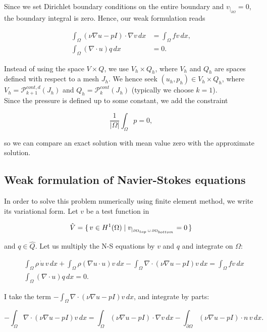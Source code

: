 \documentclass[11pt,a4paper,titlepage]{report}
\begin{document}
Since we set Dirichlet boundary conditions on the entire boundary and $v_{|_{\partial \Omega}} = 0$, the boundary integral is zero. Hence, our weak formulation reads

\begin{align}
\int_\Omega (\nu \nabla u - pI) \cdot \nabla v \,dx &= \int_\Omega fv \,dx, \\
\int_\Omega (\nabla \cdot u) q \,dx &= 0.
\end{align}

Instead of using the space $V \times Q$, we use $V_h \times Q_h$, where $V_h$ and $Q_h$ are spaces defined with respect to a mesh $J_h$. We hence seek $(u_h, p_h) \in V_h \times Q_h$, where $V_h = \mathcal{P}^{cont,d}_{k+1} (J_h)$ and $Q_h = \mathcal{P}^{cont}_{k} (J_h)$ (typically we choose $k=1$). \\


Since the pressure is defined up to some constant, we add the constraint 

\[
\frac{1}{|\Omega |} \int_{\Omega} p = 0,
\]

so we can compare an exact solution with mean value zero with the approximate solution. 

\subsection{Weak formulation of Navier-Stokes equations}


In order to solve this problem numerically using finite element method, we write its variational form. Let $v$ be a test function in

\[
\hat{V} = \set{v \in H^1(\Omega) | v_{|_{\partial \Omega_{top} \, \cup \, \partial \Omega_{bottom}}} = 0}
\]

and $q \in \hat{Q}$. Let us multiply the N-S equations by $v$ and $q$ and integrate on $\Omega$:

\begin{align}
&\int_{\Omega} \rho \, \dot{u} \, v \, dx + \int_{\Omega} \rho (\nabla u \cdot u)v \, dx - \int_{\Omega} \nabla \cdot (\nu \nabla u - pI)v \, dx = \int_{\Omega} fv \, dx \\
&\int_{\Omega} (\nabla \cdot u) q \, dx = 0.
\end{align}

I take the term $- \int_{\Omega} \nabla \cdot (\nu \nabla u - pI)v \, dx$, and integrate by parts:

\[
- \int_{\Omega} \nabla \cdot (\nu \nabla u - pI)v \, dx = \int_{\Omega} (\nu \nabla u - pI) \cdot \nabla v \, dx - \int_{\partial \Omega} (\nu \nabla u - pI) \cdot n \, v \, dx.
\]
\end{document}

